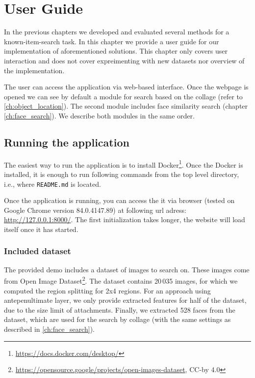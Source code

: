\chapter{User Guide}
\label{ch:user_guide}

In the previous chapters we developed and evaluated several methods for a known-item-search task. In this chapter we provide a user guide for our implementation of aforementioned solutions. This chapter only covers user interaction and does not cover expreimenting with new datasets nor overview of the implementation.

The user can access the application via web-based interface. Once the webpage is opened we can see by default a module for search based on the collage (refer to \ref{ch:object_location}). The second module includes face similarity search (chapter \ref{ch:face_search}). We describe both modules in the same order.

\section{Running the application}

The easiest way to run the application is to install Docker\footnote{\url{https://docs.docker.com/desktop/}}. Once the Docker is installed, it is enough to run following commands from the top level directory, i.e., where \verb+README.md+ is located.

\vspace{0.5cm}


\vspace{0.5cm}

Once the application is running, you can access the it via browser (tested on Google Chrome version 84.0.4147.89) at following url adress: \url{http://127.0.0.1:8000/}. The first initialization takes longer, the website will load itself once it has started. 

\subsection*{Included dataset}

The provided demo includes a dataset of images to search on. These images come from Open Image Dataset\footnote{\url{https://opensource.google/projects/open-images-dataset}, CC-by 4.0}. The dataset contains 20\,035 images, for which we computed the region splitting for 2x4 regions. For an approach using antepenultimate layer, we only provide extracted features for half of the dataset, due to the size limit of attachments. Finally, we extracted 528 faces from the dataset, which are used for the search by collage (with the same settings as described in \autoref{ch:face_search}).

